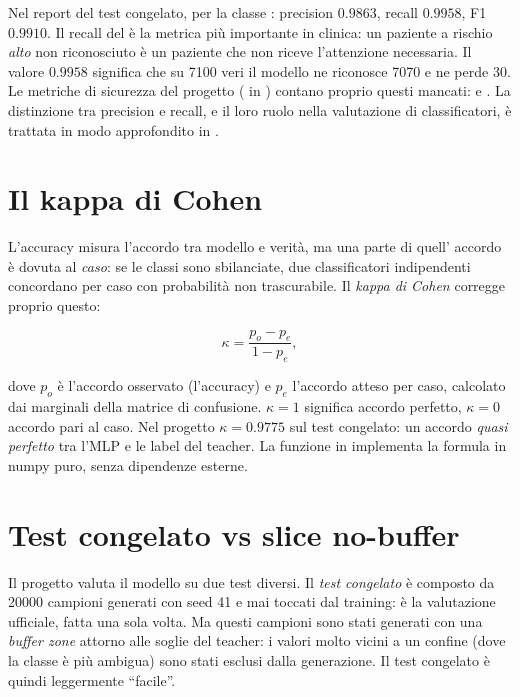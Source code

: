 Nel report del test congelato, per la classe : precision
$0.9863$, recall $0.9958$, F1 $0.9910$. Il recall del  è la
metrica più importante in clinica: un paziente a rischio \emph{alto} non
riconosciuto è un paziente che non riceve l'attenzione necessaria. Il valore
$0.9958$ significa che su 7100 veri  il modello ne riconosce
7070 e ne perde 30. Le metriche di sicurezza del progetto
( in ) contano
proprio questi mancati:  e
. La distinzione tra precision e recall,
e il loro ruolo nella valutazione di classificatori, è trattata in modo
approfondito in \cite{hastie2009elements}.

\section{Il kappa di Cohen}\label{sec:kappa-cohen}

L'accuracy misura l'accordo tra modello e verità, ma una parte di quell'
accordo è dovuta al \emph{caso}: se le classi sono sbilanciate, due
classificatori indipendenti concordano per caso con probabilità non
trascurabile. Il \emph{kappa di Cohen} corregge proprio questo:

\begin{equation}
\kappa = \frac{p_o - p_e}{1 - p_e},
\end{equation}

dove $p_o$ è l'accordo osservato (l'accuracy) e $p_e$ l'accordo atteso per
caso, calcolato dai marginali della matrice di confusione. $\kappa = 1$
significa accordo perfetto, $\kappa = 0$ accordo pari al caso. Nel progetto
$\kappa = 0.9775$ sul test congelato: un accordo \emph{quasi perfetto} tra
l'MLP e le label del teacher. La funzione  in
 implementa la formula in numpy puro, senza
dipendenze esterne.

\section{Test congelato vs slice no-buffer}\label{sec:test-no-buffer}

Il progetto valuta il modello su due test diversi. Il \emph{test congelato}
è composto da 20000 campioni generati con seed 41 e mai toccati dal
training: è la valutazione ufficiale, fatta una sola volta. Ma questi
campioni sono stati generati con una \emph{buffer zone} attorno alle soglie
del teacher: i valori molto vicini a un confine (dove la classe è più
ambigua) sono stati esclusi dalla generazione. Il test congelato è quindi
leggermente ``facile''.

